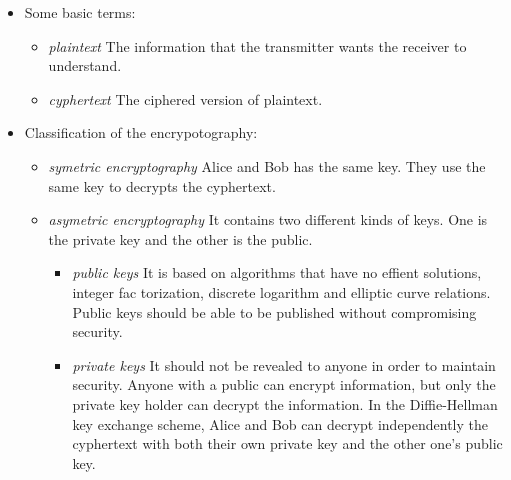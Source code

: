 \documentclass[]{article}
\begin{document}
            \begin{itemize}
                \item Some basic terms:
                \begin{itemize}
                    \item \textit{plaintext} The information that the transmitter wants the receiver to understand.
                    \item \textit{cyphertext} The ciphered version of plaintext.
                \end{itemize}
                
                \item Classification of the encrypotography:
                \begin{itemize}
                    \item \textit{symetric encryptography} Alice and Bob has the same key. They use the same key to decrypts
                    the cyphertext.
                    \item \textit{asymetric encryptography} It contains two different kinds of keys. One is the private key
                    and the other is the public.
                        \begin{itemize}
                            \item \textit{public keys} It is based on algorithms that have no effient solutions, integer fac
                            torization, discrete logarithm and elliptic curve relations. Public keys should be able to be
                            published without compromising security.
                            \item \textit{private keys} It should not be revealed to anyone in order to maintain security. 
                            Anyone with a public can encrypt information, but only the private key holder can decrypt the 
                            information. In the Diffie-Hellman key exchange scheme, Alice and Bob can decrypt independently 
                            the cyphertext with both their own private key and the other one's public key.
                        \end{itemize}
                \end{itemize}

            \end{itemize}
\end{document}
